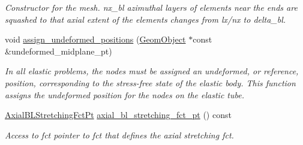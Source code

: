 \begin{DoxyCompactItemize}
\begin{DoxyCompactList}\small\item\em Constructor for the mesh. nx\+\_\+bl azimuthal layers of elements near the ends are squashed to that axial extent of the elements changes from lx/nx to delta\+\_\+bl. \end{DoxyCompactList}\item 
void \hyperlink{classoomph_1_1CircularCylindricalShellMesh_a03bba13301e4dec893d73716e146c71d}{assign\+\_\+undeformed\+\_\+positions} (\hyperlink{classoomph_1_1GeomObject}{Geom\+Object} $\ast$const \&undeformed\+\_\+midplane\+\_\+pt)
\begin{DoxyCompactList}\small\item\em In all elastic problems, the nodes must be assigned an undeformed, or reference, position, corresponding to the stress-\/free state of the elastic body. This function assigns the undeformed position for the nodes on the elastic tube. \end{DoxyCompactList}\item 
\hyperlink{classoomph_1_1CircularCylindricalShellMesh_a770336fa72e8911f31b9fe3f70197a51}{Axial\+B\+L\+Stretching\+Fct\+Pt} \hyperlink{classoomph_1_1CircularCylindricalShellMesh_aa9c69dc3c6692d19706178d558d07f86}{axial\+\_\+bl\+\_\+stretching\+\_\+fct\+\_\+pt} () const
\begin{DoxyCompactList}\small\item\em Access to fct pointer to fct that defines the axial stretching fct. \end{DoxyCompactList}\end{DoxyCompactItemize}
